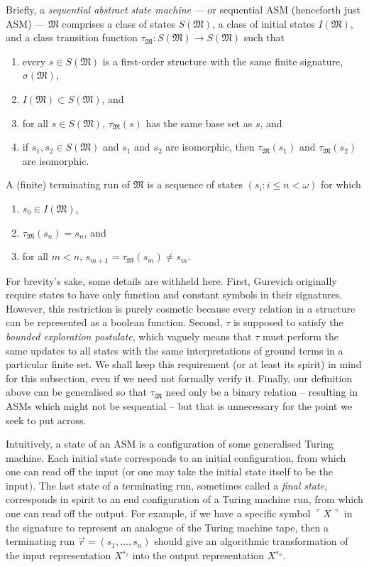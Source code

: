 \documentclass[12pt]{article}
\numberwithin{equation}{section}
\begin{document}
Briefly, a \emph{sequential abstract state machine} --- or sequential ASM (henceforth just ASM) --- $\mathfrak{M}$ comprises a class of states $S(\mathfrak{M})$, a class of initial states $I(\mathfrak{M})$, and a class transition function $\tau_{\mathfrak{M}} : S(\mathfrak{M}) \longrightarrow S(\mathfrak{M})$ such that
\begin{enumerate}[label=(A\arabic*)]
    \item\label{a1} every $s \in S(\mathfrak{M})$ is a first-order structure with the same finite signature, $\sigma(\mathfrak{M})$,
    \item\label{a2} $I(\mathfrak{M}) \subset S(\mathfrak{M})$, and
    \item\label{a3} for all $s \in S(\mathfrak{M})$, $\tau_{\mathfrak{M}}(s)$ has the same base set as $s$, and
    \item\label{a4} if $s_1, s_2 \in S(\mathfrak{M})$ and $s_1$ and $s_2$ are isomorphic, then $\tau_{\mathfrak{M}}(s_1)$ and $\tau_{\mathfrak{M}}(s_2)$ are isomorphic.
\end{enumerate}
A (finite) terminating run of $\mathfrak{M}$ is a sequence of states $(s_i : i \leq n < \omega)$ for which
\begin{enumerate}[label=(B\arabic*)]
    \item $s_0 \in I(\mathfrak{M})$,
    \item $\tau_{\mathfrak{M}}(s_n) = s_n$, and
    \item for all $m < n$, $s_{m+1} = \tau_{\mathfrak{M}}(s_m) \neq s_m$.
\end{enumerate}

For brevity's sake, some details are withheld here. First, Gurevich originally require states to have only function and constant symbols in their signatures. However, this restriction is purely cosmetic because every relation in a structure can be represented as a boolean function. Second, $\tau$ is supposed to satisfy the \emph{bounded exploration postulate}, which vaguely means that $\tau$ must perform the same updates to all states with the same interpretations of ground terms in a particular finite set. We shall keep this requirement (or at least its spirit) in mind for this subsection, even if we need not formally verify it. Finally, our definition above can be generalised so that $\tau_{\mathfrak{M}}$ need only be a binary relation -- resulting in ASMs which might not be sequential -- but that is unnecessary for the point we seek to put across.

Intuitively, a state of an ASM is a configuration of some generalised Turing machine. Each initial state corresponds to an initial configuration, from which one can read off the input (or one may take the initial state itself to be the input). The last state of a terminating run, sometimes called a \emph{final state}, corresponds in spirit to an end configuration of a Turing machine run, from which one can read off the output. For example, if we have a specific symbol $\ulcorner X \urcorner$ in the signature to represent an analogue of the Turing machine tape, then a terminating run $\Vec{r} = (s_1, \dots, s_n)$ should give an algorithmic transformation of the input representation $X^{s_1}$ into the output representation $X^{s_n}$.
\end{document}
